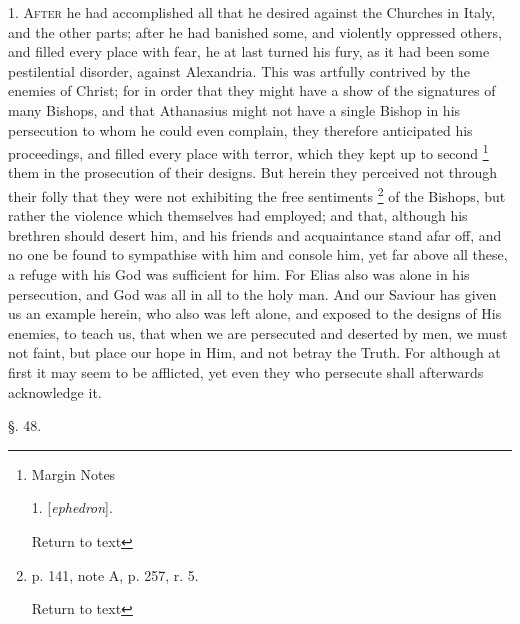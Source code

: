 1. A\textsc{fter} he had accomplished all that he desired
against the Churches in Italy, and the other parts; after he had
banished some, and violently oppressed others, and filled every place
with fear, he at last turned his fury, as it had been some
pestilential disorder, against Alexandria. This was artfully contrived
by the enemies of Christ; for in order that they might have a show of
the signatures of many Bishops, and that Athanasius might not have a
single Bishop in his persecution to whom he could even complain, they
therefore anticipated his proceedings, and filled every place with
terror, which they kept up to second \footnote{Margin Notes

1. [\emph{ephedron}].

Return to text} them in the prosecution
of their designs. But herein they perceived not through their folly
that they were not exhibiting the free sentiments \footnote{p. 141, note A, p. 257, r. 5.

Return to text} of the
Bishops, but rather the violence which themselves had employed; and
that, although his brethren should desert him, and his friends and
acquaintance stand afar off, and no one be found to sympathise with
him and console him, yet far above all these, a refuge with his God
was sufficient for him. For Elias also was alone in his persecution,
and God was all in all to the holy man. And our Saviour has given us
an example herein, who also was left alone, and exposed to the designs
of His enemies, to teach us, that when we are persecuted and deserted
by men, we must not faint, but place our hope in Him, and not betray
the Truth. For although at first it may seem to be afflicted, yet even
they who persecute shall afterwards acknowledge it.

§. 48.

